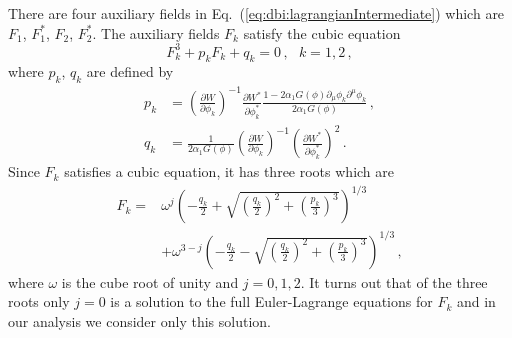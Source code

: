\documentclass[12pt]{article}
\begin{document}
There are four auxiliary fields in Eq.~(\ref{eq:dbi:lagrangianIntermediate}) which are $F_1$, $F^*_1$, $F_2$, $F^*_2$.
The auxiliary fields $F_k$ satisfy the cubic equation
\begin{equation}
  F_k^3 + p_k F_k + q_k = 0\,,
  ~~~ k = 1, 2\,,
\end{equation}
where $p_k$, $q_k$ are defined by
\begin{equation} \label{eq:DBI:pq}
  \begin{aligned}
    p_k &=
      \left(\frac{\partial W}{\partial \phi_k}\right)^{-1}
      \frac{\partial W^*}{\partial \phi^*_k}
      \frac
        {1 - 2 \alpha_1 G\left(\phi\right) \partial_\mu \phi_k \partial^\mu \phi_k}
        {2 \alpha_1 G\left(\phi\right)}\,,\\
    q_k &=
      \frac{1}{2 \alpha_1 G\left(\phi\right)}
      \left(\frac{\partial W}{\partial \phi_k}\right)^{-1}
      \left(\frac{\partial W^*}{\partial \phi^*_k}\right)^2\,.
  \end{aligned}
\end{equation}
Since $F_k$ satisfies a cubic equation, it has three roots which are
\begin{equation} \label{eq:DBI:F}
  \begin{aligned}
    F_k = &\omega^j \left(
      - \frac{q_k}{2}
      + \sqrt{\left(\frac{q_k}{2}\right)^2 + \left(\frac{p_k}{3}\right)^3}\right)^{1 / 3}\\
    & + \omega^{3 - j} \left(
      - \frac{q_k}{2}
      - \sqrt{\left(\frac{q_k}{2}\right)^2 + \left(\frac{p_k}{3}\right)^3}\right)^{1 / 3}\,,
  \end{aligned}
\end{equation}
where $\omega$ is the cube root of unity and $j = 0, 1, 2$.
It turns out that of the three roots only $j = 0$ is a solution to the full Euler-Lagrange equations for $F_k$ and in our analysis we consider only this solution.
\end{document}
